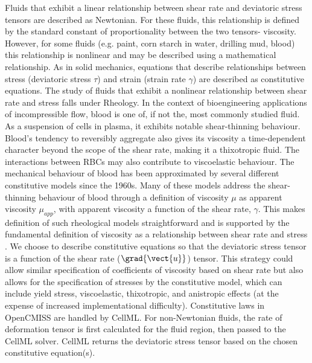 Fluids that exhibit a linear relationship between shear rate and deviatoric stress tensors are described as Newtonian. For these fluids, this relationship is defined by the standard constant of proportionality between the two tensors- viscosity. However, for some fluids (e.g. paint, corn starch in water, drilling mud, blood) this relationship is nonlinear and may be described using a mathematical relationship. As in solid mechanics, equations that describe relationships between stress (deviatoric stress $\tau$) and strain (strain rate $\gamma$) are described as constitutive equations. The study of fluids that exhibit a nonlinear relationship between shear rate and stress falls under Rheology.
In the context of bioengineering applications of incompressible flow, blood is one of, if not the, most commonly studied fluid. As a suspension of cells in plasma, it exhibits notable shear-thinning behaviour. Blood's tendency to reversibly aggregate also gives its viscosity a time-dependent character beyond the scope of the shear rate, making it a thixotropic fluid. The interactions between RBCs may also contribute to viscoelastic behaviour.
% 
The mechanical behaviour of blood has been approximated by several different constitutive models since the 1960s. Many of these models address the shear-thinning behaviour of blood through a definition of viscosity $\mu$ as apparent viscosity $\mu_{app}$, with apparent viscosity a function of the shear rate, $\gamma$. This makes definition of such rheological models straightforward and is supported by the fundamental definition of viscosity as a relationship between shear rate and stress \cite{white_viscous_2006}. We choose to describe constitutive equations so that the deviatoric stress tensor is a function of the shear rate ($\grad{\vect{u}}$) tensor. This strategy could allow similar specification of coefficients of viscosity based on shear rate but also allows for the specification of stresses by the constitutive model, which can include yield stress, viscoelastic, thixotropic, and anistropic effects (at the expense of increased implementational difficulty). 
Constitutive laws in OpenCMISS are handled by CellML. For non-Newtonian fluids, the rate of deformation tensor is first calculated for the fluid region, then passed to the CellML solver. CellML returns the deviatoric stress tensor based on the chosen constitutive equation(s). 

